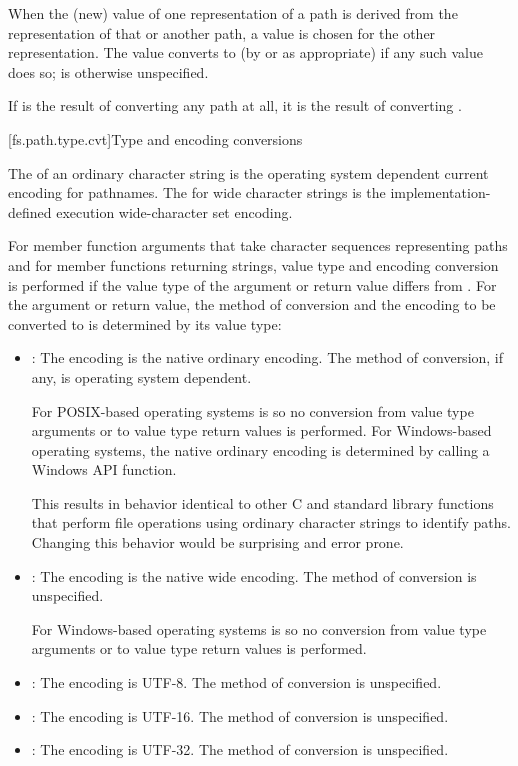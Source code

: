\pnum
When the (new) value  of one representation of a path
is derived from the representation of that or another path,
a value  is chosen for the other representation.
The value  converts to 
(by  or  as appropriate)
if any such value does so;
 is otherwise unspecified.
\begin{note}
If  is the result of converting any path at all,
it is the result of converting .
\end{note}


[fs.path.type.cvt]{Type and encoding conversions}

\pnum
The  of an ordinary character string is
the operating system dependent current encoding
for pathnames.
The  for wide character strings is
the implementation-defined execution
wide-character set encoding.

\pnum
For member function arguments that take character sequences representing
paths and for member functions returning strings, value type and encoding
conversion is performed if the value type of the argument or return value differs from
.
For the argument or return value, the method of conversion and the encoding
to be converted to is determined
by its value type:
\begin{itemize}
\item {}: The encoding is the native ordinary encoding.
The method of conversion, if any, is operating system dependent.
\begin{note}
For POSIX-based operating systems  is 
so no conversion from  value type arguments or to 
value type return values is performed.
For Windows-based operating systems, the
native ordinary encoding is determined by calling a Windows API function.
\end{note}
\begin{note}
This results in behavior identical to other C and \Cpp{}
standard library functions that perform file operations using ordinary character
strings to identify paths. Changing this behavior would be surprising and error
prone.
\end{note}
\item {}: The encoding is the native wide encoding.
The method of conversion is unspecified.
\begin{note}
For Windows-based operating systems  is 
so no conversion from  value type arguments or to 
value type return values is performed.
\end{note}
\item {}: The encoding is UTF-8. The method of conversion
is unspecified.
\item {}: The encoding is UTF-16. The method of conversion
is unspecified.
\item {}: The encoding is UTF-32. The method of conversion
is unspecified.
\end{itemize}

